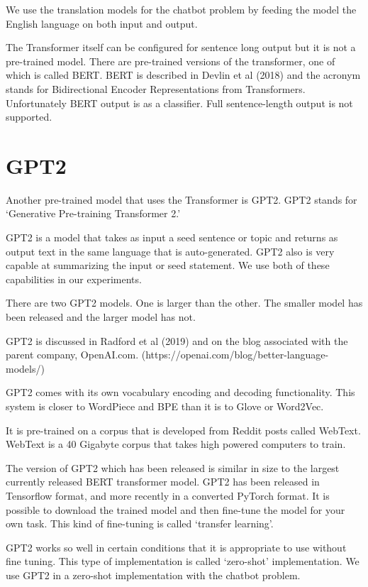 We use the translation models for the chatbot problem by feeding the model the English language on both input and output. 

The Transformer itself can be configured for sentence long output but it is not a pre-trained model. There are pre-trained versions of the transformer, one of which is called BERT. BERT is described in Devlin et al (2018)\cite{DBLP:journals/corr/abs-1810-04805} and the acronym stands for Bidirectional Encoder Representations from Transformers. Unfortunately BERT output is as a 
classifier. Full sentence-length output is not supported.

\section{GPT2}

Another pre-trained model that uses the Transformer is GPT2. GPT2 stands for `Generative Pre-training Transformer 2.'

GPT2 is a model that takes as input a seed sentence or topic and returns as output text in the same language that is auto-generated. GPT2 also is very capable at summarizing the input or seed statement. We use both of these capabilities in our experiments.

There are two GPT2 models. One is larger than the other. The smaller model has been released and the larger model has not. 

GPT2 is discussed in Radford et al (2019)\cite{radford2019language} and on the blog associated with the parent company, OpenAI.com. (https://openai.com/blog/better-language-models/)

GPT2 comes with its own vocabulary encoding and decoding functionality. This system is closer to
WordPiece and BPE than it is to Glove or Word2Vec.

It is pre-trained on a corpus that is developed from Reddit posts called WebText. WebText is a
40 Gigabyte corpus that takes high powered computers to train.

The version of GPT2 which has been released is similar in size to the largest currently released 
BERT transformer model. GPT2 has been released in Tensorflow format, and more recently in a converted PyTorch format. It is possible to download the trained model and then fine-tune the model for your own task. This kind of fine-tuning is called `transfer learning'. 

GPT2 works so well in certain conditions that it is appropriate to use without fine tuning. This 
type of implementation is called `zero-shot' implementation. We use GPT2 in a zero-shot implementation with the chatbot problem.

